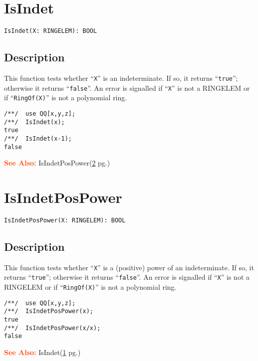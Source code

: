 \documentclass[a4paper]{mybook}
\newenvironment{command}{}{} %
\newcommand\SeeAlso{\par\textcolor{OrangeRed}{\textbf{\large See Also: }}}
\begin{document}
\section{IsIndet}
\label{IsIndet}
\begin{command} %


\begin{Verbatim}[label=syntax, rulecolor=\color{MidnightBlue},
frame=single]
IsIndet(X: RINGELEM): BOOL
\end{Verbatim}


\subsection*{Description}

This function tests whether ``\verb&X&'' is an indeterminate.  If so, it
returns ``\verb&true&''; otherwise it returns ``\verb&false&''.  An error is
signalled if ``\verb&X&'' is not a RINGELEM or if ``\verb&RingOf(X)&'' is not a
polynomial ring.
\begin{Verbatim}[label=example, rulecolor=\color{PineGreen}, frame=single]
/**/  use QQ[x,y,z];
/**/  IsIndet(x);
true
/**/  IsIndet(x-1);
false
\end{Verbatim}


\SeeAlso %
  IsIndetPosPower(\ref{IsIndetPosPower} pg.\pageref{IsIndetPosPower})
\end{command} %

\section{IsIndetPosPower}
\label{IsIndetPosPower}
\begin{command} %


\begin{Verbatim}[label=syntax, rulecolor=\color{MidnightBlue},
frame=single]
IsIndetPosPower(X: RINGELEM): BOOL
\end{Verbatim}


\subsection*{Description}

This function tests whether ``\verb&X&'' is a (positive) power of an indeterminate.
If so, it returns ``\verb&true&''; otherwise it returns ``\verb&false&''.  An error is
signalled if ``\verb&X&'' is not a RINGELEM or if ``\verb&RingOf(X)&'' is not a
polynomial ring.
\begin{Verbatim}[label=example, rulecolor=\color{PineGreen}, frame=single]
/**/  use QQ[x,y,z];
/**/  IsIndetPosPower(x);
true
/**/  IsIndetPosPower(x/x);
false
\end{Verbatim}


\SeeAlso %
  IsIndet(\ref{IsIndet} pg.\pageref{IsIndet})
\end{command} %
\end{document}

